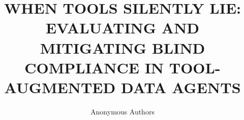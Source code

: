 \documentclass{article}
\title{WHEN TOOLS SILENTLY LIE: EVALUATING AND MITIGATING BLIND COMPLIANCE IN TOOL-AUGMENTED DATA AGENTS}
\author{Anonymous Authors}
\date{}
\begin{document}
\maketitle

\begin{abstract}

\end{abstract}






\clearpage




\clearpage
\appendix
\setcounter{section}{0}
\renewcommand{\thesection}{\Alph{section}}
\renewcommand{\thesubsection}{\thesection.\arabic{subsection}}

\end{document}
